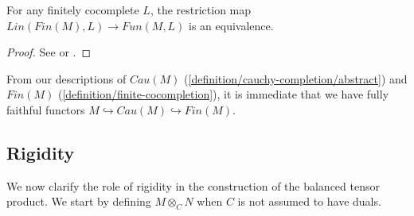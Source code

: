 \begin{lemma}\label{univ_prop_fin}

  \noindent For any finitely cocomplete $L$, the restriction map $Lin(Fin(M),L)\to
  Fun(M,L)$ is an equivalence.
\end{lemma}

\begin{proof}
 See \cite[Section 5.7]{kelly/basic-concepts-enriched} or \cite[Section
   2.2.1]{lopezfranco/tensor-products}.
\end{proof}

\begin{remark}
  From our descriptions of $Cau(M)$
  (\ref{definition/cauchy-completion/abstract}) and $Fin(M)$
  (\ref{definition/finite-cocompletion}), it is immediate that we have fully
  faithful functors $M\hookrightarrow Cau(M)\hookrightarrow Fin(M)$.
\end{remark}

\subsection{Rigidity} %

We now clarify the role of rigidity in the construction of the balanced tensor
product. We start by defining $M\otimes_C N$ when $C$ is not assumed to have
duals.

